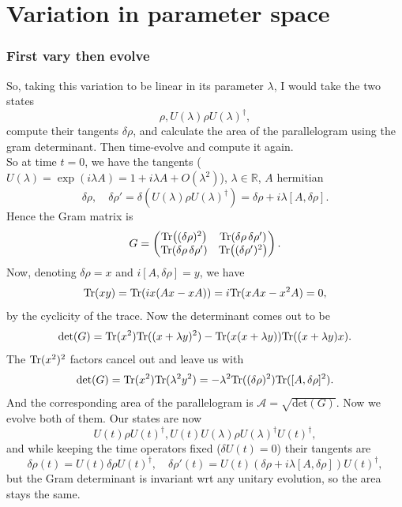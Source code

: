 \documentclass{article}
\begin{document}
\section{Variation in parameter space}
\subsubsection{First vary then evolve}
So, taking this variation to be linear in its parameter $\lambda$, I would take the two states 
\[
    \rho, U(\lambda)\rho U(\lambda)^\dag,
\]
compute their tangents $\delta\rho$, and calculate the area of the parallelogram using the gram determinant. Then time-evolve and compute it again. \\
So at time $t=0$, we have the tangents ($U(\lambda) = \exp(i\lambda A) = 1+i\lambda A + O(\lambda^2)$), $\lambda \in \mathbb{R}$, $A$ hermitian
\[
    \delta \rho, \quad \delta\rho' = \delta (U(\lambda)\rho U(\lambda)^\dag) = \delta \rho + i\lambda [A, \delta\rho].
\]
Hence the Gram matrix is
\[
    G=
    \begin{pmatrix}
    \text{Tr}\!\left((\delta\rho)^2\right) & \text{Tr}\!\left(\delta\rho\,\delta\rho'\right)\\
    \text{Tr}\!\left(\delta\rho\,\delta\rho'\right) & \text{Tr}\!\left((\delta\rho')^2\right)
    \end{pmatrix}.
\]
Now, denoting $\delta\rho = x$ and $i[A,\delta\rho] = y$, we have
\[
    \text{Tr}(xy) = \text{Tr}(ix(Ax-xA)) = i\text{Tr}(xAx-x^2A) = 0,
\]
by the cyclicity of the trace. Now the determinant comes out to be
\[
    \text{det}(G) = \text{Tr}(x^2)\text{Tr}((x+\lambda y)^2) - \text{Tr}(x(x+\lambda y))\text{Tr}((x+\lambda y)x).
\]
The $\text{Tr}(x^2)^2$ factors cancel out and leave us with
\[
    \text{det}(G) = \text{Tr}(x^2)\text{Tr}(\lambda^2 y^2) = -\lambda^2\text{Tr}((\delta\rho)^2)\text{Tr}([A,\delta\rho]^2).
\]
And the corresponding area of the parallelogram is $\mathcal{A} = \sqrt{\text{det}(G)}$. Now we evolve both of them. Our states are now 
\[
    U(t)\rho U(t)^\dag, U(t)U(\lambda)\rho U(\lambda)^\dag U(t)^\dag,
\]
and while keeping the time operators fixed ($\delta U(t) = 0$) their tangents are
\[
    \delta\rho(t) = U(t)\delta\rho U(t)^\dag, \quad \delta\rho'(t) = U(t) \left(\delta \rho + i\lambda [A, \delta\rho]\right) U(t)^\dag,
\]
but the Gram determinant is invariant wrt any unitary evolution, so the area stays the same. \\
\end{document}
